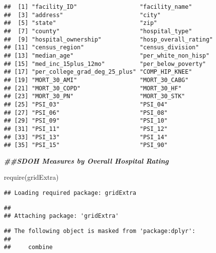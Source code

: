 \documentclass[
]{article}
\newenvironment{Shaded}{\begin{snugshade}}{\end{snugshade}}
\newcommand{\DocumentationTok}[1]{\textcolor[rgb]{0.56,0.35,0.01}{\textbf{\textit{#1}}}}
\newcommand{\FunctionTok}[1]{\textcolor[rgb]{0.00,0.00,0.00}{#1}}
\newcommand{\NormalTok}[1]{#1}
\begin{document}
\begin{verbatim}
##  [1] "facility_ID"                  "facility_name"               
##  [3] "address"                      "city"                        
##  [5] "state"                        "zip"                         
##  [7] "county"                       "hospital_type"               
##  [9] "hospital_ownership"           "hosp_overall_rating"         
## [11] "census_region"                "census_division"             
## [13] "median_age"                   "per_white_non_hisp"          
## [15] "med_inc_15plus_12mo"          "per_below_poverty"           
## [17] "per_college_grad_deg_25_plus" "COMP_HIP_KNEE"               
## [19] "MORT_30_AMI"                  "MORT_30_CABG"                
## [21] "MORT_30_COPD"                 "MORT_30_HF"                  
## [23] "MORT_30_PN"                   "MORT_30_STK"                 
## [25] "PSI_03"                       "PSI_04"                      
## [27] "PSI_06"                       "PSI_08"                      
## [29] "PSI_09"                       "PSI_10"                      
## [31] "PSI_11"                       "PSI_12"                      
## [33] "PSI_13"                       "PSI_14"                      
## [35] "PSI_15"                       "PSI_90"
\end{verbatim}

\begin{Shaded}
\begin{Highlighting}[]
\DocumentationTok{\#\#SDOH Measures by Overall Hospital Rating}

\FunctionTok{require}\NormalTok{(gridExtra)}
\end{Highlighting}
\end{Shaded}

\begin{verbatim}
## Loading required package: gridExtra
\end{verbatim}

\begin{verbatim}
## 
## Attaching package: 'gridExtra'
\end{verbatim}

\begin{verbatim}
## The following object is masked from 'package:dplyr':
## 
##     combine
\end{verbatim}
\end{document}
